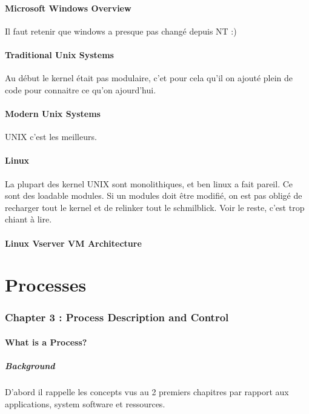 \subsection{Microsoft Windows Overview}
Il faut retenir que windows a presque pas changé depuis NT :)

\subsection{Traditional Unix Systems}
Au début le kernel était pas modulaire, c’et pour cela qu’il on ajouté plein de code pour connaitre ce qu’on ajourd’hui.

\subsection{Modern Unix Systems}
UNIX c’est les meilleurs.

\subsection{Linux}
La plupart des kernel UNIX sont monolithiques, et ben linux a fait pareil. Ce sont des loadable modules. Si un modules doit être modifié, on est pas obligé de recharger tout le kernel et de relinker tout le schmilblick. Voir le reste, c’est trop chiant à lire.

\subsection{Linux Vserver VM Architecture}

\newpage



\part{Processes}

\section{Chapter 3 : Process Description and Control}

\subsection{What is a Process?}
\subsubsection{Background}
D’abord il rappelle les concepts vus au 2 premiers chapitres par rapport aux applications, system software et ressources.
